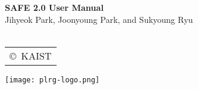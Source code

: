 \documentclass[oneside,openany,a4paper,10pt]{book}
\begin{document}
\begin{titlepage}
    \vspace*{15em}
    \centering
    {\bfseries\Huge
        SAFE 2.0 User Manual\\
    }    
        \vskip2cm
       {\Large
 Jihyeok Park, Joonyoung Park, and Sukyoung Ryu}\\
~\\
\large
\begin{tabular}{c}
                        \copyright\ KAIST
\end{tabular}
\texttt{[image: plrg-logo.png]}
\end{titlepage}

\multibegin
\raggedcolumns









\normalsize



\multiend
\end{document}

